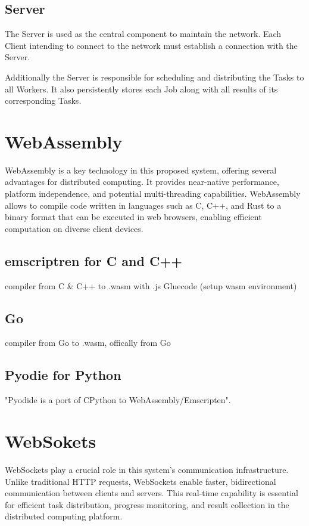 \subsection{Server}
\label{subsec:methodology:entities:Server}
The Server is used as the central component to maintain the network. Each Client intending to connect to the network must establish a connection with the Server.

Additionally the Server is responsible for scheduling and distributing the Tasks to all Workers. It also persistently stores each Job along with all results of its corresponding Tasks.

\section{WebAssembly}
\label{sec:methodology:wasm}
WebAssembly is a key technology in this proposed system, offering several advantages for distributed computing. It provides near-native performance, platform independence, and potential multi-threading capabilities. WebAssembly allows to compile code written in languages such as C, C++, and Rust to a binary format that can be executed in web browsers, enabling efficient computation on diverse client devices.

\cite{methodology:wasmdocu, relatedwork:wasmedgecomputing}
\subsection{emscriptren for C and C++}
\label{subsec:methodology:wasm:cpp}
compiler from C \& C++ to .wasm with .js Gluecode (setup wasm environment) \cite{methodology:emcc}
\subsection{Go}
\label{subsec:methodology:wasm:go}
compiler from Go to .wasm, offically from Go \cite{methodology:go}
\subsection{Pyodie for Python}
\label{subsec:methodology:wasm:python}
"Pyodide is a port of CPython to WebAssembly/Emscripten". \cite{methodology:pyodie}

\section{WebSokets}
\label{sec:methodology:websokets}
WebSockets play a crucial role in this system's communication infrastructure. Unlike traditional HTTP requests, WebSockets enable faster, bidirectional communication between clients and servers. This real-time capability is essential for efficient task distribution, progress monitoring, and result collection in the distributed computing platform.

